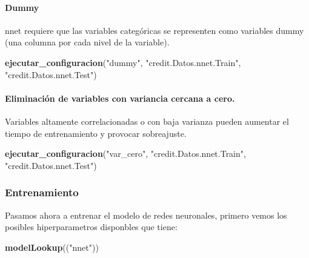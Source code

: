 \documentclass[
]{article}
\newenvironment{Shaded}{\begin{snugshade}}{\end{snugshade}}
\newcommand{\FunctionTok}[1]{\textcolor[rgb]{0.13,0.29,0.53}{\textbf{#1}}}
\newcommand{\NormalTok}[1]{#1}
\newcommand{\StringTok}[1]{\textcolor[rgb]{0.31,0.60,0.02}{#1}}
\begin{document}
\hypertarget{dummy-1}{%
\paragraph{Dummy}\label{dummy-1}}

nnet requiere que las variables categóricas se representen como
variables dummy (una columna por cada nivel de la variable).

\begin{Shaded}
\begin{Highlighting}[]
\FunctionTok{ejecutar\_configuracion}\NormalTok{(}\StringTok{"dummy"}\NormalTok{, }\StringTok{"credit.Datos.nnet.Train"}\NormalTok{, }\StringTok{"credit.Datos.nnet.Test"}\NormalTok{)}
\end{Highlighting}
\end{Shaded}

\hypertarget{eliminaciuxf3n-de-variables-con-variancia-cercana-a-cero.}{%
\paragraph{Eliminación de variables con variancia cercana a
cero.}\label{eliminaciuxf3n-de-variables-con-variancia-cercana-a-cero.}}

Variables altamente correlacionadas o con baja varianza pueden aumentar
el tiempo de entrenamiento y provocar sobreajuste.

\begin{Shaded}
\begin{Highlighting}[]
\FunctionTok{ejecutar\_configuracion}\NormalTok{(}\StringTok{"var\_cero"}\NormalTok{, }\StringTok{"credit.Datos.nnet.Train"}\NormalTok{, }\StringTok{"credit.Datos.nnet.Test"}\NormalTok{)}
\end{Highlighting}
\end{Shaded}

\hypertarget{entrenamiento-1}{%
\subsubsection{Entrenamiento}\label{entrenamiento-1}}

Pasamos ahora a entrenar el modelo de redes neuronales, primero vemos
los posibles hiperparametros disponbles que tiene:

\begin{Shaded}
\begin{Highlighting}[]
\FunctionTok{modelLookup}\NormalTok{((}\StringTok{"nnet"}\NormalTok{))}
\end{Highlighting}
\end{Shaded}
\end{document}
